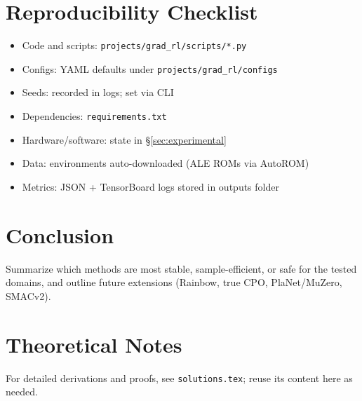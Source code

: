 \documentclass[12pt]{article}
\newcommand{\code}[1]{\texttt{#1}}
\begin{document}
\section{Reproducibility Checklist}
\begin{itemize}[leftmargin=*]
    \item Code and scripts: \code{projects/grad\_rl/scripts/*.py}
    \item Configs: YAML defaults under \code{projects/grad\_rl/configs}
    \item Seeds: recorded in logs; set via CLI
    \item Dependencies: \code{requirements.txt}
    \item Hardware/software: state in \S\ref{sec:experimental}
    \item Data: environments auto-downloaded (ALE ROMs via AutoROM)
    \item Metrics: JSON + TensorBoard logs stored in outputs folder
\end{itemize}

\section{Conclusion}
Summarize which methods are most stable, sample-efficient, or safe for the tested domains, and outline future extensions (Rainbow, true CPO, PlaNet/MuZero, SMACv2).




\appendix
\section{Theoretical Notes}
For detailed derivations and proofs, see \code{solutions.tex}; reuse its content here as needed.
\end{document}
